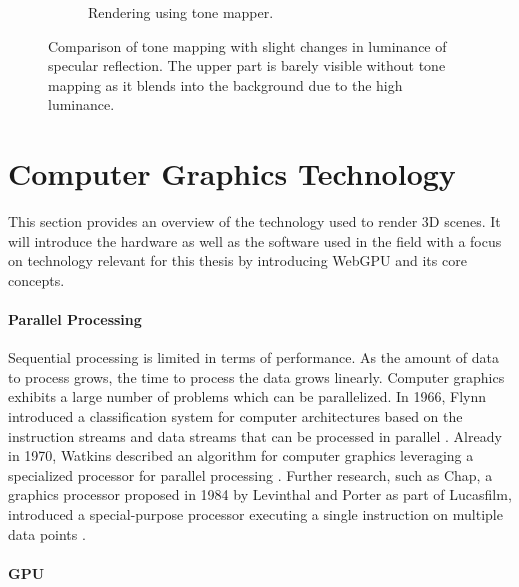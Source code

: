 \begin{figure}[H]
\begin{subfigure}[t]{0.3\textwidth}
    \caption{Rendering using tone mapper.}
    \label{fig:tone-mapping-applied}
  \end{subfigure}
  \hspace*{2cm}
  \caption{Comparison of tone mapping with slight changes in luminance of specular reflection. The upper part is barely visible without tone mapping as it blends into the background due to the high luminance.}
  \label{fig:tone-mapping}
\end{figure}

\section{Computer Graphics Technology}

This section provides an overview of the technology used to render 3D scenes. It will introduce the hardware as well as the software used in the field with a focus on technology relevant for this thesis by introducing \gls{WebGPU} and its core concepts.

\paragraph{Parallel Processing}

Sequential processing is limited in terms of performance. As the amount of data to process grows, the time to process the data grows linearly. Computer graphics exhibits a large number of problems which can be parallelized. In 1966, Flynn introduced a classification system for computer architectures based on the instruction streams and data streams that can be processed in parallel \cite{flynnTaxonomy,flynnTaxonomy2}. Already in 1970, Watkins described an algorithm for computer graphics leveraging a specialized processor for parallel processing \cite{surfaceAlgorithmProcessor}. Further research, such as Chap, a  graphics processor proposed in 1984 by Levinthal and Porter as part of Lucasfilm, introduced a special-purpose processor executing a single instruction on multiple data points \cite{chapSIMDgpu}.

\paragraph{GPU}

